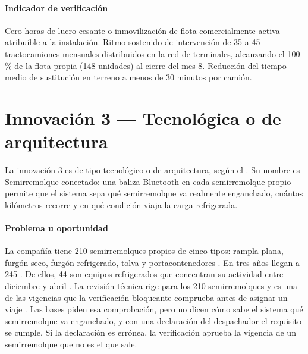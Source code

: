 
\paragraph{Indicador de verificación} Cero horas de lucro cesante o inmovilización de flota
comercialmente activa atribuible a la instalación. Ritmo sostenido de intervención de 35 a 45
tractocamiones mensuales distribuidos en la red de terminales, alcanzando el 100 \% de la flota propia
(148 unidades) al cierre del mes 8. Reducción del tiempo medio de sustitución en terreno a menos de
30 minutos por camión.


\section{Innovación 3 — Tecnológica o de arquitectura}\label{sec:13-innovacion-3}

La innovación 3 es de tipo tecnológico o de arquitectura, según el . Su nombre es
Semirremolque conectado: una baliza Bluetooth en cada semirremolque propio permite que el sistema sepa
qué semirremolque va realmente enganchado, cuántos kilómetros recorre y en qué condición viaja la carga
refrigerada.

\paragraph{Problema u oportunidad} La compañía tiene 210 semirremolques propios de cinco tipos: rampla
plana, furgón seco, furgón refrigerado, tolva y portacontenedores . En tres años
llegan a 245 . De ellos, 44 son equipos refrigerados que concentran su
actividad entre diciembre y abril . La revisión técnica rige para los 210
semirremolques  y es una de las vigencias que la verificación bloqueante
comprueba antes de asignar un viaje . Las bases piden esa comprobación, pero no
dicen cómo sabe el sistema qué semirremolque va enganchado, y con una declaración del despachador el
requisito se cumple. Si la declaración es errónea, la verificación aprueba la vigencia de un
semirremolque que no es el que sale.

